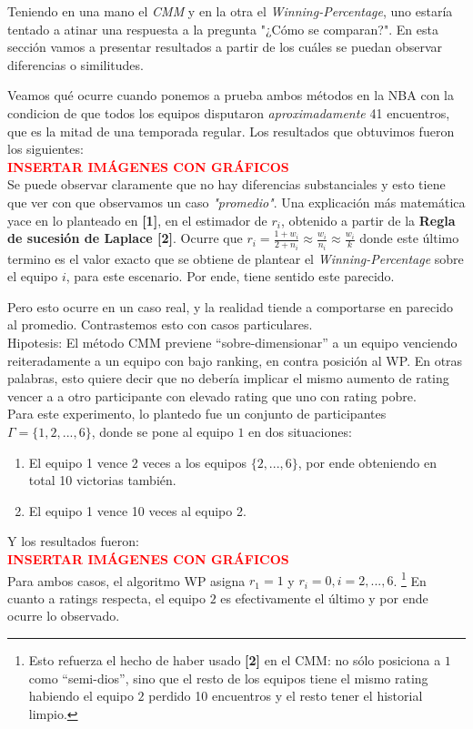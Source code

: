 Teniendo en una mano el \textit{CMM} y en la otra el \textit{Winning-Percentage}, uno estar\'ia tentado a atinar una respuesta a la pregunta "¿C\'omo se comparan?". En esta secci\'on vamos a presentar resultados a partir de los cu\'ales se puedan observar diferencias o similitudes.

Veamos qu\'e ocurre cuando ponemos a prueba ambos m\'etodos en la NBA con la condicion de que todos los equipos disputaron \textit{aproximadamente} 41 encuentros, que es la mitad de una temporada regular. Los resultados que obtuvimos fueron los siguientes: \\

\textcolor{red}{\textbf{INSERTAR IM\'AGENES CON GR\'AFICOS}} \\

Se puede observar claramente que no hay diferencias substanciales y esto tiene que ver con que observamos un caso \textit{"promedio"}. Una explicaci\'on m\'as matem\'atica yace en lo planteado en \textbf{[1]}, en el estimador de $r_{i}$, obtenido a partir de la \textbf{Regla de sucesi\'on de Laplace [2]}. Ocurre que $r_{i} = \frac{1 + w_{i}}{2 + n_{i}} \approx \frac{w_{i}}{n_{i}} \approx \frac{w_{i}}{k}$ donde este \'ultimo termino es el valor exacto que se obtiene de plantear el \textit{Winning-Percentage} sobre el equipo $i$, para este escenario. Por ende, tiene sentido este parecido.

Pero esto ocurre en un caso real, y la realidad tiende a comportarse en parecido al promedio. Contrastemos esto con casos particulares. \\

Hipotesis: El m\'etodo CMM previene ``sobre-dimensionar'' a un equipo venciendo reiteradamente a un equipo con bajo ranking, en contra posici\'on al WP. En otras palabras, esto quiere decir que no deber\'ia implicar el mismo aumento de rating vencer a a otro participante con elevado rating que uno con rating pobre. \\

Para este experimento, lo plantedo fue un conjunto de participantes $\Gamma = \{1,2,...,6\}$, donde se pone al equipo $1$ en dos situaciones:

\begin{enumerate}
\item El equipo 1 vence 2 veces a los equipos $\{2,...,6\}$, por ende obteniendo en total 10 victorias tambi\'en.
\item El equipo 1 vence 10 veces al equipo 2.
\end{enumerate}

Y los resultados fueron: \\

\textcolor{red}{\textbf{INSERTAR IM\'AGENES CON GR\'AFICOS}} \\

Para ambos casos, el algoritmo WP asigna $r_1 = 1$ y $r_i = 0, i = 2, ..., 6$. \footnote{Esto refuerza el hecho de haber usado \textbf{[2]} en el CMM: no s\'olo posiciona a $1$ como ``semi-dios'', sino que el resto de los equipos tiene el mismo rating habiendo el equipo $2$ perdido 10 encuentros y el resto tener el historial limpio.} En cuanto a ratings respecta, el equipo $2$ es efectivamente el \'ultimo y por ende ocurre lo observado. \\
